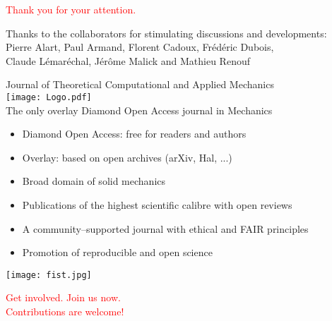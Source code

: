 \documentclass[8pt,red]{beamer}
\begin{document}
\frame
{

  

  \vspace{1cm}
  \centerline{\textcolor{red}{ Thank you for your attention.}}

  \begin{center}
    Thanks to the collaborators for stimulating discussions and developments:\\[2mm]
    
    Pierre Alart, Paul Armand, Florent Cadoux, Fr\'ed\'eric Dubois,\\
    Claude L\'emar\'echal, J\'er\^ome Malick and Mathieu Renouf 
  \end{center}
}
\begin{frame}
\begin{center}
    \large{Journal of Theoretical Computational and Applied Mechanics}\\[2mm]
    
    \texttt{[image: Logo.pdf]}\\[3mm]

    {The only overlay Diamond Open Access journal in Mechanics}
\end{center}
\vspace{1mm}
\begin{itemize}
    \item Diamond Open Access: free for readers and authors
    \item Overlay: based on open archives (arXiv, Hal, ...)
    \item Broad domain of solid mechanics
    \item Publications of the highest scientific calibre with open reviews
    \item A community--supported journal with ethical and  FAIR principles
    \item Promotion of reproducible and open science
\end{itemize}
\vspace{1mm}
\begin{center}

\begin{minipage}{0.35\textwidth}
  \texttt{[image: fist.jpg]}
\end{minipage}
\large\textcolor{red}{Get involved. Join us now. \\Contributions are welcome!}

\end{center}
\end{frame}


 
\def\newblock{}
{\scriptsize
\printbibliography
}
\end{document}
